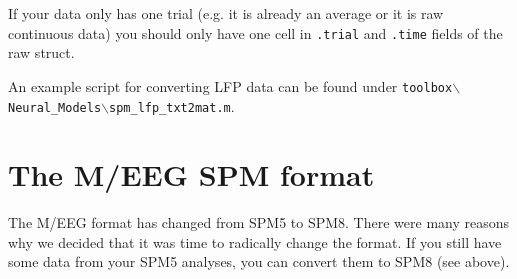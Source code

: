 If your data only has one trial (e.g. it is already an average or it is raw continuous data) you should only have one cell in \texttt{.trial} and \texttt{.time} fields of the raw struct.

An example script for converting LFP data can be found under \texttt{toolbox$\backslash$Neural\_Models$\backslash$spm\_lfp\_txt2mat.m}.

\section{The M/EEG SPM format}
The M/EEG format has changed from SPM5 to SPM8. There were many reasons why we decided that it was time to radically change the format. If you still have some data from your SPM5 analyses, you can convert them to SPM8 (see above).

